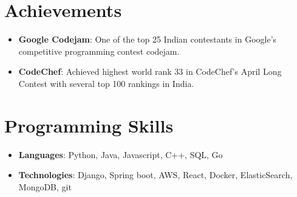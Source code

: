 \documentclass[letterpaper,11pt]{article}
\newcommand{\resumeItem}[2]{
  \item\small{
    \textbf{#1}{: #2 \vspace{-2pt}}
  }
}
\newcommand{\resumeSubItem}[2]{\resumeItem{#1}{#2}\vspace{-4pt}}
\newcommand{\resumeSubHeadingListStart}{\begin{itemize}[leftmargin=*]}
\newcommand{\resumeSubHeadingListEnd}{\end{itemize}}
\begin{document}
\section{Achievements}
  \resumeSubHeadingListStart
    \resumeSubItem{Google Codejam}
      {One of the top 25 Indian contestants in Google's competitive programming contest codejam.}
    \resumeSubItem{CodeChef}
      {Achieved highest world rank 33 in CodeChef's April Long Contest with several top 100 rankings in India.}
  \resumeSubHeadingListEnd


\section{Programming Skills}
 \resumeSubHeadingListStart
    \item{\textbf{Languages}{: Python, Java, Javascript, C++, SQL, Go}}
    \item{\textbf{Technologies}{: Django, Spring boot, AWS, React, Docker, ElasticSearch, MongoDB, git}}
 \resumeSubHeadingListEnd


\end{document}
